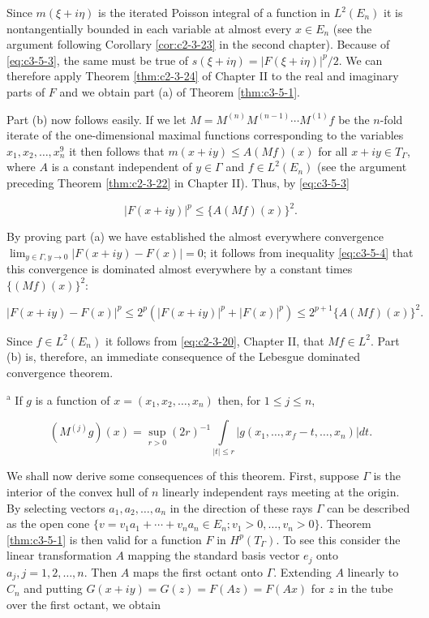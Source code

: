 Since $m(\xi + i\eta)$ is the iterated Poisson integral of a function in $L^2(E_n)$ it is nontangentially bounded in each variable at almost every $x \in E_n$ (see the argument following Corollary \ref{cor:c2-3-23} in the second chapter). Because of \eqref{eq:c3-5-3}, the same must be true of $s(\xi + i\eta) = |F(\xi + i\eta)|^p/2$. We can therefore apply Theorem \ref{thm:c2-3-24} of Chapter II to the real and imaginary parts of $F$ and we obtain part (a) of Theorem \ref{thm:c3-5-1}.

Part (b) now follows easily. If we let $M = M^{(n)}M^{(n-1)} \cdots M^{(1)}f$ be the $n$-fold iterate of the one-dimensional maximal functions corresponding to the variables $x_1, x_2, \ldots, x_n^9$ it then follows that $m(x + iy) \leq A(Mf)(x)$ for all $x + iy \in T_\Gamma$, where $A$ is a constant independent of $y \in \Gamma$ and $f \in L^2(E_n)$ (see the argument preceding Theorem \ref{thm:c2-3-22} in Chapter II). Thus, by \eqref{eq:c3-5-3}

\begin{equation}\label{eq:c3-5-4}
|F(x+i y)|^{p}\leq\{A(M f)(x)\}^{2}.
\end{equation}

By proving part (a) we have established the almost everywhere convergence $\lim_{y \in \Gamma, y \to 0} |F(x + iy) - F(x)| = 0$; it follows from inequality \eqref{eq:c3-5-4} that this convergence is dominated almost everywhere by a constant times $\{(Mf)(x)\}^2$:

\[
|F(x+i y)-F(x)|^{p}\leq2^{p}(|F(x+i y)|^{p}+|F(x)|^{p})\leq2^{p+1}\{A(M f)(x)\}^{2}.
\]

Since $f \in L^2(E_n)$ it follows from \eqref{eq:c2-3-20}, Chapter II, that $Mf \in L^2$. Part (b) is, therefore, an immediate consequence of the Lebesgue dominated convergence theorem.

$^{\mathrm{a}}$ If $g$ is a function of $x = (x_1, x_2, \ldots, x_n)$ then, for $1 \leq j \leq n$,

\[
(M^{(j)}g)(x)=\sup_{r>0}(2r)^{-1}\int\limits_{|t|\leq r}|g(x_{1},\ldots,x_{f}-t,\ldots,x_{n})| d t.
\]

We shall now derive some consequences of this theorem. First, suppose $\Gamma$ is the interior of the convex hull of $n$ linearly independent rays meeting at the origin. By selecting vectors $a_1, a_2, \ldots, a_n$ in the direction of these rays $\Gamma$ can be described as the open cone $\{v = v_1 a_1 + \cdots + v_n a_n \in E_n; v_1 > 0, \ldots, v_n > 0\}$. Theorem \ref{thm:c3-5-1} is then valid for a function $F$ in $H^p(T_\Gamma)$. To see this consider the linear transformation $A$ mapping the standard basis vector $e_j$ onto $a_j, j = 1, 2, \ldots, n$. Then $A$ maps the first octant onto $\Gamma$. Extending $A$ linearly to $C_n$ and putting $G(x + iy) = G(z) = F(Az) = F(Ax)$ for $z$ in the tube over the first octant, we obtain

